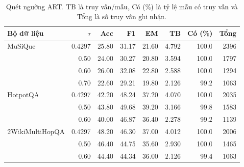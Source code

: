 \begin{table}[htbp]\centering\small
\caption{Quét ngưỡng ART. TB là truy vấn/mẫu, Có (\%) là tỷ lệ mẫu có truy vấn và Tổng là số truy vấn ghi nhận.}
\label{tab:sweep}
\begin{tabular}{@{}lrrrrrrr@{}}
\toprule
Bộ dữ liệu & $\tau$ & Acc & F1 & EM & TB & Có (\%) & Tổng \\
\midrule
MuSiQue & 0.4297 & 25.80 & 31.17 & 21.60 & 4.792 & 100.0 & 2396 \\
 & 0.50 & 24.00 & 30.27 & 20.80 & 3.594 & 100.0 & 1797 \\
 & 0.60 & 26.00 & 32.08 & 22.80 & 2.588 & 100.0 & 1294 \\
 & 0.70 & 22.60 & 29.21 & 19.80 & 2.126 & 99.2 & 1063 \\
HotpotQA & 0.4297 & 42.20 & 48.24 & 37.20 & 4.070 & 100.0 & 2035 \\
 & 0.50 & 43.80 & 49.68 & 39.20 & 3.166 & 99.8 & 1583 \\
 & 0.60 & 40.00 & 46.87 & 36.40 & 2.278 & 99.2 & 1139 \\
2WikiMultiHopQA & 0.4297 & 48.20 & 46.30 & 37.00 & 4.012 & 100.0 & 2006 \\
 & 0.50 & 46.40 & 44.75 & 35.60 & 2.930 & 100.0 & 1465 \\
 & 0.60 & 44.40 & 44.34 & 36.00 & 2.126 & 99.4 & 1063 \\
\bottomrule
\end{tabular}
\end{table}

